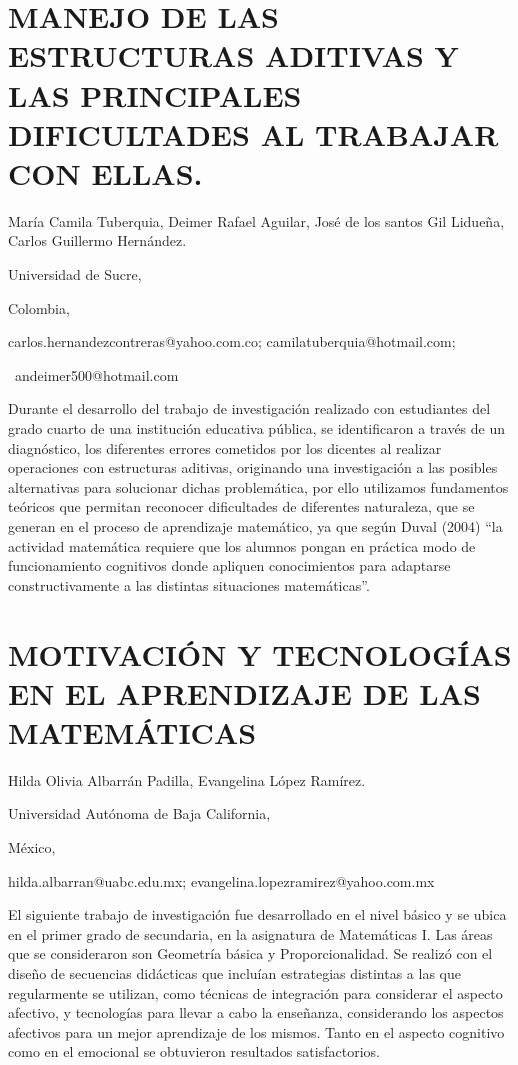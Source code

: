 \section{MANEJO DE LAS ESTRUCTURAS ADITIVAS Y LAS PRINCIPALES DIFICULTADES
AL TRABAJAR CON ELLAS.}

\begin{datos}

María Camila Tuberquia, Deimer Rafael Aguilar, José de los santos
Gil Lidueña, Carlos Guillermo Hernández.

Universidad de Sucre,

Colombia,

carlos.hernandezcontreras@yahoo.com.co; camilatuberquia@hotmail.com;

 andeimer500@hotmail.com 

\end{datos}

Durante el desarrollo del trabajo de investigación realizado con estudiantes
del grado cuarto de una institución educativa pública, se identificaron
a través de un diagnóstico, los diferentes errores cometidos por los
dicentes al realizar operaciones con estructuras aditivas, originando
una investigación a las posibles alternativas para solucionar dichas
problemática, por ello utilizamos fundamentos teóricos que permitan
reconocer dificultades de diferentes naturaleza, que se generan en
el proceso de aprendizaje matemático, ya que según Duval (2004) “la
actividad matemática requiere que los alumnos pongan en práctica modo
de funcionamiento cognitivos donde apliquen conocimientos para adaptarse
constructivamente a las distintas situaciones matemáticas”.


\section{MOTIVACIÓN Y TECNOLOGÍAS EN EL APRENDIZAJE DE LAS MATEMÁTICAS}

\begin{datos}

Hilda Olivia Albarrán Padilla, Evangelina López Ramírez.

Universidad Autónoma de Baja California,

México,

hilda.albarran@uabc.edu.mx; evangelina.lopezramirez@yahoo.com.mx

\end{datos}

El siguiente trabajo de investigación fue desarrollado en el nivel
básico y se ubica en el primer grado de secundaria, en la asignatura
de Matemáticas I. Las áreas que se consideraron son Geometría básica
y Proporcionalidad. Se realizó con el diseño de secuencias didácticas
que incluían estrategias distintas a las que regularmente se utilizan,
como técnicas de integración para considerar el aspecto afectivo,
y tecnologías para llevar a cabo la enseñanza, considerando los aspectos
afectivos para un mejor aprendizaje de los mismos. Tanto en el aspecto
cognitivo como en el emocional se obtuvieron resultados satisfactorios.


